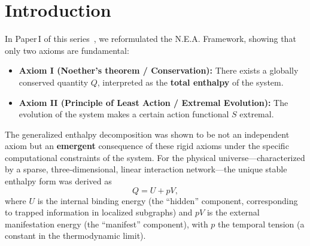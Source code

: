 \documentclass{article}
\begin{document}
\begin{abstract}
Building on the reformulated N.E.A. Framework established in Paper I, we take the emergent physical enthalpy $Q = U + pV$—which follows from the rigid axioms (Noether’s theorem and the principle of least action) under the constraints of sparsity, three‑dimensionality, and linear interactions—as the starting point for a unified derivation of the basic structure of the physical universe. We show that this enthalpy form uniquely determines the spatial dimension to be $d = 3$, leads to the Einstein field equations as a thermodynamic consistency argument (assuming a discrete Rindler horizon and continuum limit), and provides a candidate mechanism for the gauge group $U(1) \times SU(2) \times SU(3)$ from spectral degeneracy. The derivations are presented in full detail, with all assumptions explicitly noted. Gravity is interpreted as “spatial anemia”: the depletion of the manifest computational budget $pV$ caused by the formation of trapped information knots $U$. A possible route to the Lorentzian signature from the sign structure of directed causal edges is outlined as a research direction, while the full derivation remains an open problem. The remaining open problems—the rigorous construction of a discrete Rindler horizon, the emergence of the fermion spectrum, and the mathematical convergence of sparse graph limits—are clearly identified. This paper demonstrates that the N.E.A. Framework, with only two rigid axioms, provides a coherent foundation for fundamental physics.
\end{abstract}

\section{Introduction}
In Paper I of this series~\cite{paperI}, we reformulated the N.E.A. Framework, showing that only two axioms are fundamental:
\begin{itemize}
    \item \textbf{Axiom I (Noether’s theorem / Conservation):} There exists a globally conserved quantity $Q$, interpreted as the \textbf{total enthalpy} of the system.
    \item \textbf{Axiom II (Principle of Least Action / Extremal Evolution):} The evolution of the system makes a certain action functional $S$ extremal.
\end{itemize}
The generalized enthalpy decomposition was shown to be not an independent axiom but an \textbf{emergent} consequence of these rigid axioms under the specific computational constraints of the system. For the physical universe—characterized by a sparse, three‑dimensional, linear interaction network—the unique stable enthalpy form was derived as
\[
Q = U + pV,
\]
where $U$ is the internal binding energy (the “hidden” component, corresponding to trapped information in localized subgraphs) and $pV$ is the external manifestation energy (the “manifest” component), with $p$ the temporal tension (a constant in the thermodynamic limit).
\end{document}
